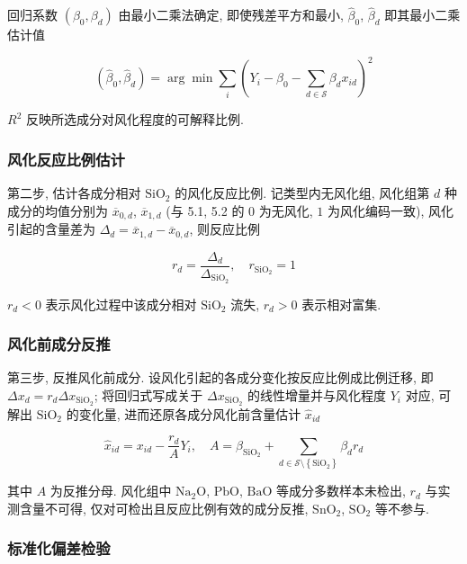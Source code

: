 \documentclass{ctexart}
\begin{document}
回归系数 $\left(\beta_0,\beta_d\right)$ 由最小二乘法确定, 即使残差平方和最小, $\widehat{\beta}_0$, $\widehat{\beta}_d$ 即其最小二乘估计值

\begin{equation*}
\left(\widehat\beta_{0},\widehat\beta_{d}\right)=\arg\min\sum_{i}\left(Y_i-\beta_{0}-\sum_{d\in\mathcal{S}}\beta_{d}x_{id}\right)^{2}
\end{equation*}

$R^2$ 反映所选成分对风化程度的可解释比例.


\subsubsection{风化反应比例估计}

第二步, 估计各成分相对 $\mathrm{SiO_2}$ 的风化反应比例. 记类型内无风化组, 风化组第 $d$ 种成分的均值分别为 $\overline{x}_{0,d}$, $\overline{x}_{1,d}$ (与 5.1, 5.2 的 $0$ 为无风化, $1$ 为风化编码一致), 风化引起的含量差为 $\Delta_{d}=\overline{x}_{1,d}-\overline{x}_{0,d}$, 则反应比例

\begin{equation*}
r_{d}=\frac{\Delta_{d}}{\Delta_{\mathrm{SiO_2}}},\quad{r}_{\mathrm{SiO_2}}=1
\end{equation*}

$r_{d}<0$ 表示风化过程中该成分相对 $\mathrm{SiO_2}$ 流失, $r_{d}>0$ 表示相对富集.


\subsubsection{风化前成分反推}

第三步, 反推风化前成分. 设风化引起的各成分变化按反应比例成比例迁移, 即 $\Delta{x}_{d}=r_{d}\Delta{x}_{\mathrm{SiO_2}}$; 将回归式写成关于 $\Delta{x}_{\mathrm{SiO_2}}$ 的线性增量并与风化程度 $Y_i$ 对应, 可解出 $\mathrm{SiO_2}$ 的变化量, 进而还原各成分风化前含量估计 $\widehat{x}_{id}$

\begin{equation*}
\widehat{x}_{id}=x_{id}-\frac{r_{d}}{A}Y_i,\quad{A}=\beta_{\mathrm{SiO_2}}+\sum_{d\in\mathcal{S}\setminus\left\{\mathrm{SiO_2}\right\}}\beta_{d}r_{d}
\end{equation*}

其中 $A$ 为反推分母. 风化组中 $\mathrm{Na_2O}$, $\mathrm{PbO}$, $\mathrm{BaO}$ 等成分多数样本未检出, $r_d$ 与实测含量不可得, 仅对可检出且反应比例有效的成分反推, $\mathrm{SnO_2}$, $\mathrm{SO_2}$ 等不参与.


\subsubsection{标准化偏差检验}
\end{document}
